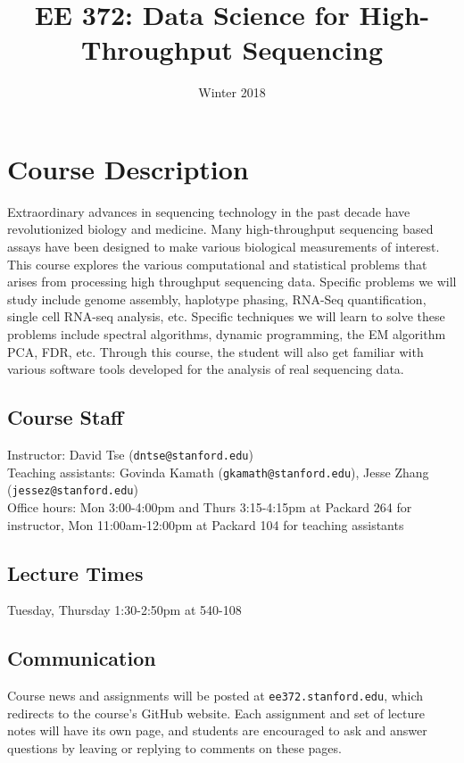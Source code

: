 \documentclass[11pt,onecolumn]{article}
\title{EE 372: Data Science for High-Throughput Sequencing}
\author{Winter 2018}
\date{\vspace{-5ex}}
\begin{document}
\maketitle

\section*{Course Description}
Extraordinary advances in sequencing technology in the past decade have revolutionized biology and medicine. Many high-throughput sequencing based assays have been designed to make various biological measurements of interest. This course explores the various computational and statistical problems that arises from processing high throughput sequencing data. Specific problems we will study include genome assembly, haplotype phasing, RNA-Seq quantification, single cell RNA-seq analysis, etc.  Specific techniques we will learn to solve these problems include spectral algorithms, dynamic programming, the EM algorithm PCA, FDR, etc. Through this course, the student will also get familiar with various software tools developed for the analysis of real sequencing data.

\subsection*{Course Staff}
Instructor: David Tse (\texttt{dntse@stanford.edu}) \\
Teaching assistants: Govinda Kamath (\texttt{gkamath@stanford.edu}), Jesse Zhang (\texttt{jessez@stanford.edu}) \\
Office hours: Mon 3:00-4:00pm and Thurs 3:15-4:15pm at Packard 264 for instructor, Mon 11:00am-12:00pm at Packard 104 for teaching assistants

\subsection*{Lecture Times}
Tuesday, Thursday 1:30-2:50pm at 540-108

\subsection*{Communication}
Course news and assignments will be posted at \texttt{ee372.stanford.edu}, which redirects to the course's GitHub website. Each assignment and set of lecture notes will have its own page, and students are encouraged to ask and answer questions by leaving or replying to comments on these pages.
\end{document}
